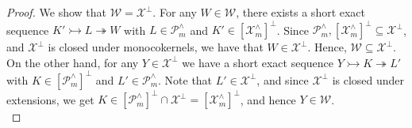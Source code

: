 \documentclass[10pt,reqno]{amsart}
\numberwithin{equation}{section}
\theoremstyle{remark}
\newcommand{\X}{\mathcal{X}}
\begin{document}
\begin{proof}
We show that $\mathcal{W} = \mathcal{X}^\perp$. For any $W \in \mathcal{W}$, there exists a short exact sequence $K' \rightarrowtail L \twoheadrightarrow W$ with $L \in \mathcal{P}^\wedge_m$ and $K' \in [\mathcal{X}^\wedge_m]^\perp$. Since $\mathcal{P}^\wedge_m, [\mathcal{X}^\wedge_m]^\perp \subseteq \mathcal{X}^\perp$, and $\mathcal{X}^\perp$ is closed under monocokernels, we have that $W \in \mathcal{X}^\perp$. Hence, $\mathcal{W} \subseteq \mathcal{X}^\perp$. On the other hand, for any $Y \in \mathcal{X}^\perp$ we have a short exact sequence $Y \rightarrowtail K \twoheadrightarrow L'$ with $K \in [\mathcal{P}^\wedge_m]^\perp$ and $L' \in \mathcal{P}^\wedge_m$. Note that $L' \in \mathcal{X}^\perp$, and since $\mathcal{X}^\perp$ is closed under extensions, we get $K \in [\mathcal{P}^\wedge_m]^\perp \cap \mathcal{X}^\perp = [\X^{\wedge}_m]^{\perp}$, and hence $Y \in \mathcal{W}$. \\ 
\end{proof}
\end{document}
